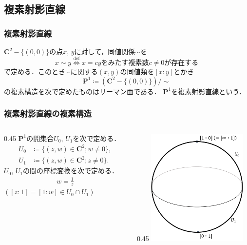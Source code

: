\documentclass[dvipdfmx,12pt,aspectratio=169]{beamer}%
\newcommand{\cc}{\mathbf{C}}
\newcommand{\pp}{\mathbf{P}}
\begin{document}
\subsection{複素射影直線}

\begin{frame}
    \frametitle{複素射影直線}

    $\cc^{2}-\{(0,0)\}$の点$x$, $y$に対して，同値関係${\sim}$を
\begin{equation*}
    x\sim y\overset{\text{def}}{\Longleftrightarrow}
    x = cy\text{をみたす複素数}c\neq 0\text{が存在する}
\end{equation*}
で定める．このとき$\sim$に関する$(x,y)$の同値類を$[x:y]$とかき
\begin{equation*}
    \pp^1\coloneqq \left(\cc^{2}-\{(0,0)\}\right)/{\sim}
\end{equation*}
の複素構造を次で定めたものはリーマン面である．
$\pp^1$を複素射影直線という．
\end{frame}

\begin{frame}
    \frametitle{複素射影直線の複素構造}
    \begin{columns}
        \begin{column}{0.45\hsize}
            $\pp^1$の開集合$U_0$, $U_1$を次で定める．
            \begin{align*}
                U_0&\coloneqq\{(z,w)\in\cc^2; w\neq0\},\\
                U_1&\coloneqq\{(z,w)\in\cc^2; z\neq0\}.
            \end{align*}
            $U_0$, $U_1$の間の座標変換を次で定める．
            \begin{align*}
                w=\frac{1}{z}
            \end{align*}
            $([z:1]=[1:w]\in U_0\cap U_1)$
        \end{column}
        \begin{column}{0.45\hsize}
            \includegraphics[width=5cm]{fig/riemann-sphere.pdf}
            \centering
        \end{column}
    \end{columns}
\end{frame}
\end{document}
